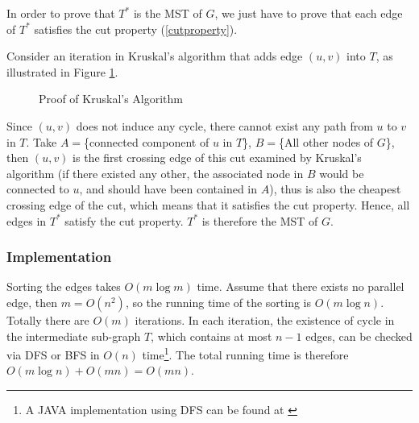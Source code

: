 In order to prove that $T^*$ is the MST of $G$, we just have to prove that each edge of $T^*$ satisfies the cut property (\ref{cutproperty}). 

Consider an iteration in Kruskal's algorithm that adds edge $(u,v)$ into $T$, as illustrated in Figure \ref{proofkruskal}. 
\begin{figure}[ht]
\centering
{}
\caption{Proof of Kruskal's Algorithm}\label{proofkruskal}
\end{figure}

Since $(u,v)$ does not induce any cycle, there cannot exist any path from $u$ to $v$ in $T$. Take $A=$\{connected component of $u$ in $T$\}, $B=$\{All other nodes of $G$\}, then $(u,v)$ is the first crossing edge of this cut examined by Kruskal's algorithm (if there existed any other, the associated node in $B$ would be connected to $u$, and should have been contained in $A$), thus is also the cheapest crossing edge of the cut, which means that it satisfies the cut property. Hence, all edges in $T^*$ satisfy the cut property. $T^*$ is 
therefore the MST of $G$.
\subsubsection{Implementation}
Sorting the edges takes $O(m\log m)$ time. Assume that there exists no parallel edge, then $m=O(n^2)$, so the running time of the sorting is $O(m\log n)$. Totally there are $O(m)$ iterations. In each iteration, the existence of cycle in the intermediate sub-graph $T$, which contains at most $n-1$ edges, can be checked via DFS or BFS in $O(n)$ time\footnote{A JAVA implementation using DFS can be found at \href{http://algs4.cs.princeton.edu/code/edu/princeton/cs/algs4/Cycle.java.html}{}}. The total running time is therefore $O(m\log n) + O(mn)=O(mn)$. 

